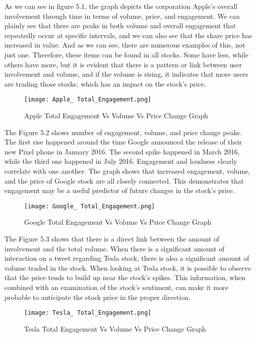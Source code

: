 \documentclass[12pt, a4paper,twoside]{report}
\theoremstyle{plain} %
\theoremstyle{definition} %
\theoremstyle{remark} %
\numberwithin{equation}{chapter}
\begin{document}
    As we can see in figure 5.1, the graph depicts the corporation Apple's overall involvement through time in terms of volume, price, and engagement. We can plainly see that there are peaks in both volume and overall engagement that repeatedly occur at specific intervals, and we can also see that the share price has increased in value. And as we can see, there are numerous examples of this, not just one. Therefore, these items can be found in all stocks. Some have less, while others have more, but it is evident that there is a pattern or link between user involvement and volume, and if the volume is rising, it indicates that more users are trading those stocks, which has an impact on the stock's price.

    
    \begin{figure}
        \centering
        \texttt{[image: Apple\_ Total\_Engagement.png]}
        \caption{Apple Total Engagement Vs Volume Vs Price Change Graph}
        \label{fig:enter-label1}
    \end{figure}

    The Figure 5.2 shows number of engagement, volume, and price change peaks. The first rise happened around the time Google announced the release of their new Pixel phone in January 2016. The second spike happened in March 2016, while the third one happened in July 2016.  Engagement and loudness clearly correlate with one another. The graph shows that increased engagement, volume, and the price of Google stock are all closely connected. This demonstrates that engagement may be a useful predictor of future changes in the stock's price.
    \begin{figure}
        \centering
        \texttt{[image: Google\_ Total\_Engagement.png]}
        \caption{Google Total Engagement Vs Volume Vs Price Change Graph}
        \label{fig:enter-label2}
    \end{figure}

    The Figure 5.3 shows that there is a direct link between the amount of involvement and the total volume. When there is a significant amount of interaction on a tweet regarding Tesla stock, there is also a significant amount of volume traded in the stock. When looking at Tesla stock, it is possible to observe that the price tends to build up near the stock's spikes. This information, when combined with an examination of the stock's sentiment, can make it more probable to anticipate the stock price in the proper direction.
    \begin{figure}
        \centering
        \texttt{[image: Tesla\_ Total\_Engagement.png]}
        \caption{Tesla Total Engagement Vs Volume Vs Price Change Graph}
        \label{fig:enter-label3}
    \end{figure}
\end{document}
